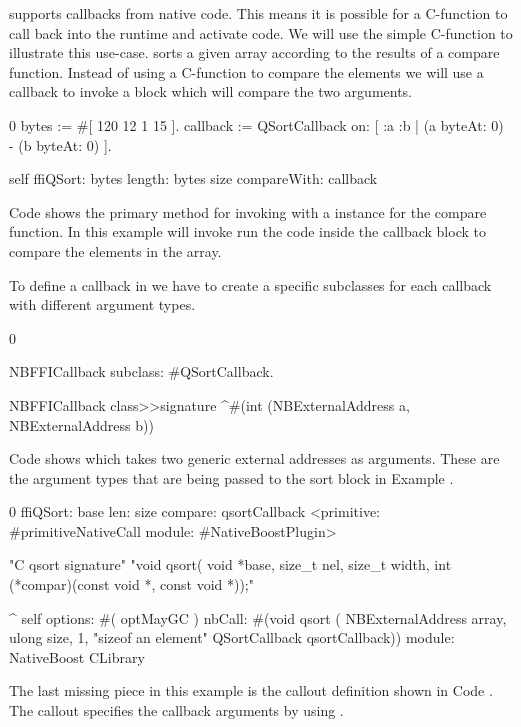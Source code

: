 \NB supports callbacks from native code.
This means it is possible for a C-function to call back into the \PH runtime and activate code.
We will use the simple  C-function to illustrate this use-case.
 sorts a given array according to the results of a compare function.
Instead of using a C-function to compare the elements we will use a callback to invoke a \PH block which will compare the two arguments.
%
\begin{stcode}[
	label={lst:ffi-calloutWithCallback},
	caption={Example of callout passing a callback for \ttt{qsort}}]{0}
bytes := #[ 120 12 1 15 ].
callback := QSortCallback on: [ :a :b |
				(a byteAt: 0) - (b byteAt: 0) ].

self ffiQSort: bytes
	 length: bytes size
	 compareWith: callback
\end{stcode}
%
Code  shows the primary \PH method for invoking  with a  instance for the compare function.
In this example  will invoke run the \PH code inside the callback block to compare the elements in the  array.

To define a callback in \NB we have to create a specific subclasses for each callback with different argument types.
%
\begin{stcode}[
	label={lst:ffi-callbackDefinition},
	caption={Example of callback definition}]{0}

NBFFICallback
    subclass: #QSortCallback.

NBFFICallback class>>signature
	^#(int (NBExternalAddress a, NBExternalAddress b))
\end{stcode}
%
Code  shows  which takes two generic external addresses as arguments.
These are the argument types that are being passed to the sort block in Example .
%
\begin{stcode}[
	label={lst:ffi-qsort},
	caption={Example of callout passing a callback}]{0}
ffiQSort: base len: size compare: qsortCallback
	<primitive: #primitiveNativeCall
	 module: #NativeBoostPlugin>

	"C qsort signature"
	"void qsort(
		void *base,
		size_t nel,
		size_t width,
		int (*compar)(const void *, const void *));"

	^ self
		options: #( optMayGC )
		nbCall: #(void qsort (
					NBExternalAddress array,
					ulong size,
					1, "sizeof an element"
					QSortCallback qsortCallback))
		module: NativeBoost CLibrary
\end{stcode}
%
The last missing piece in this example is the callout definition shown in Code .
The \NB callout specifies the callback arguments by using .


